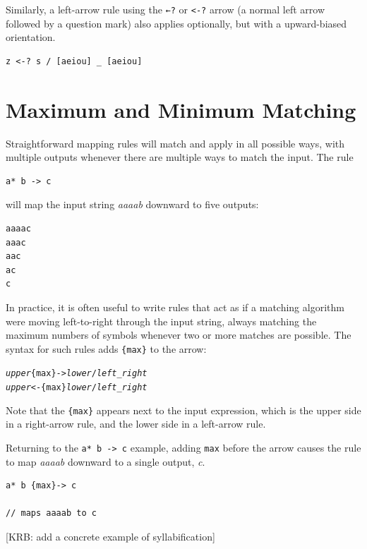 Similarly, a left-arrow rule using the \texttt{←?} or \texttt{<-?} arrow (a normal left arrow followed by a question mark) also
applies optionally, but with a upward-biased orientation.

\begin{Verbatim}
z <-? s / [aeiou] _ [aeiou]
\end{Verbatim}

\section{Maximum and Minimum Matching}

Straightforward mapping rules will match and apply in all possible ways, with multiple outputs
whenever there are multiple ways to match the input.  The rule

\begin{Verbatim}
a* b -> c
\end{Verbatim}

\noindent
will map the input string \emph{aaaab} downward to five outputs:

\begin{Verbatim}
aaaac
aaac
aac
ac
c
\end{Verbatim}


In practice, it is often useful to write rules that act as
if a matching algorithm were moving left-to-right through the input string, always matching the
	maximum numbers of symbols whenever two or more matches are possible.  The syntax for such rules
	adds \verb!{max}! to the arrow:

\begin{alltt}
\emph{upper} \{max\}-> \emph{lower} / \emph{left} _ \emph{right}
\emph{upper} <-\{max\} \emph{lower} / \emph{left} _ \emph{right}
\end{alltt}

\noindent
Note that the \verb!{max}! appears next to the input expression, which is the upper side in a right-arrow rule, and the lower side
in a left-arrow rule.

Returning to the \verb!a* b -> c! example, adding \verb!max! before the arrow causes the rule to map
\emph{aaaab} downward to a single output, \emph{c}.

\begin{Verbatim}
a* b {max}-> c

// maps aaaab to c
\end{Verbatim}


[KRB: add a concrete example of syllabification]  

